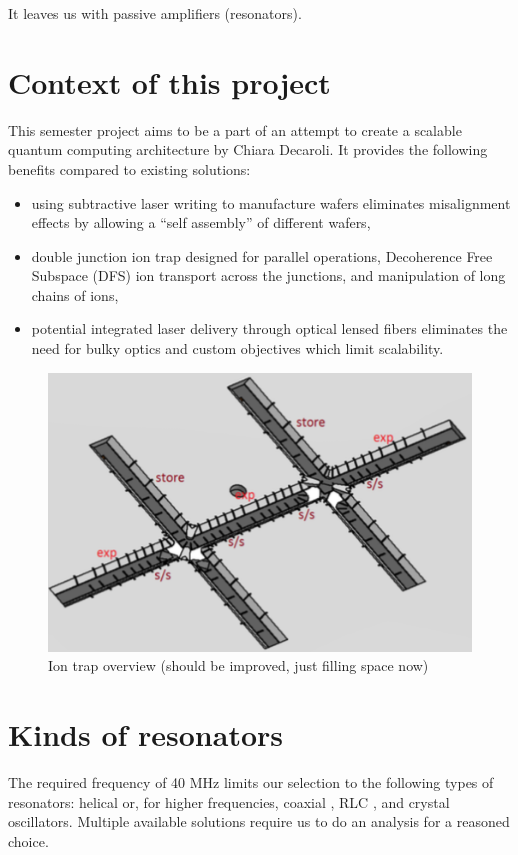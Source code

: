 It leaves us with passive amplifiers (resonators).
\section{Context of this project}
\label{sec:context}
This semester project aims to be a part of an attempt to create a scalable quantum computing architecture by Chiara Decaroli. It provides the following benefits compared to existing solutions:
\begin{itemize}
	\item using subtractive laser writing to manufacture wafers eliminates misalignment effects by allowing a ``self assembly'' of different wafers,
	\item double junction ion trap designed for parallel operations, Decoherence Free Subspace (DFS) ion transport across the junctions, and manipulation of long chains of ions,
	\item potential integrated laser delivery through optical lensed fibers eliminates the need for bulky optics and custom objectives which limit scalability.
\end{itemize}

\begin{figure}[h]
	\centering
	\includegraphics[width=.9\textwidth]{images/trap}
	\caption{Ion trap overview (should be improved, just filling space now)}
\end{figure}

\section{Kinds of resonators}
\label{sec:kinds_resonators}
The required frequency of 40 MHz limits our selection to the following types of resonators: helical \cite{Gulde2017, Johnson2016, VanRynbach2016, Kassa2016, Kassa2017} or, for higher frequencies, coaxial \cite{Karin2012}, RLC \cite{Gandolfi2010, Kumph2015, Greene2016}, and crystal oscillators. Multiple available solutions require us to do an analysis for a reasoned choice.
